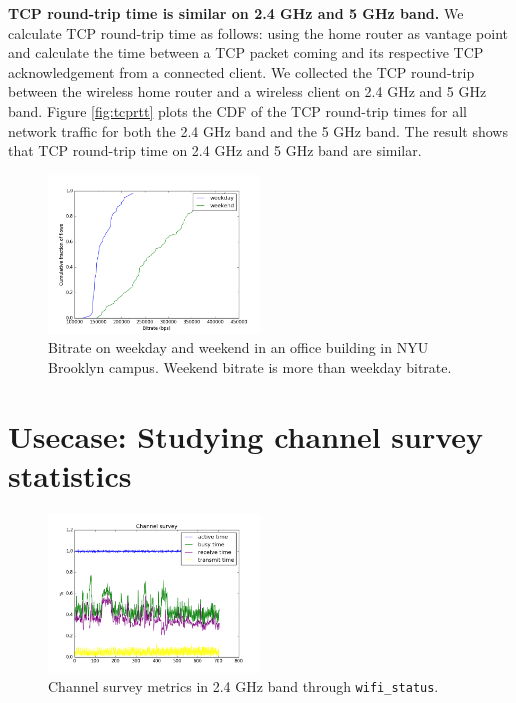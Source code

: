 \textbf{TCP round-trip time is similar on 2.4 GHz and 5 GHz band.} We calculate TCP round-trip time as follows: using the home router as vantage point and calculate the time between a TCP packet coming and its respective TCP acknowledgement from a connected client. We collected the TCP round-trip between the wireless home router and a wireless client on 2.4 GHz and 5 GHz band. Figure \ref{fig:tcprtt} plots the CDF of the TCP round-trip times for all network traffic for both the 2.4 GHz band and the 5 GHz band. The result shows that TCP round-trip time on 2.4 GHz and 5 GHz band are similar.

\begin{figure}
\centering
\includegraphics[width=0.5\textwidth]{figure/bitrate(weekday_vs_weekend).png}
\caption{Bitrate on weekday and weekend in an office building in NYU Brooklyn campus. Weekend bitrate is more than weekday bitrate.} 
\label{fig:compare}
\end{figure}  

\section{Usecase: Studying channel survey statistics}
\label{sec.usecase2}

\begin{figure}
\centering
\includegraphics[width=0.5\textwidth]{figure/channel.png}
\caption{Channel survey metrics in 2.4 GHz band through \texttt{wifi\_status}.} 
\label{fig:channelsurvey}
\end{figure}

